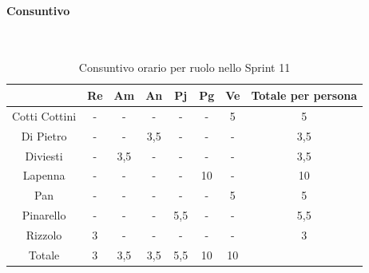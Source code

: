 \documentclass{article}
\begin{document}
                \paragraph{Consuntivo}\mbox{}\\
                \begin{table}[H]
                    \centering
                    \begin{tabular}{|c|c|c|c|c|c|c|c|}
                    \hline
                                  & Re  & Am  & An  & Pj  & Pg  & Ve  & Totale per persona \\ \hline
                    Cotti Cottini & -   & -   & -   & -   & -   & 5   & 5                  \\ \hline
                    Di Pietro     & -   & -   & 3,5 & -   & -   & -   & 3,5                \\ \hline
                    Diviesti      & -   & 3,5 & -   & -   & -   & -   & 3,5                \\ \hline
                    Lapenna       & -   & -   & -   & -   & 10  & -   & 10                 \\ \hline
                    Pan           & -   & -   & -   & -   & -   & 5   & 5                  \\ \hline
                    Pinarello     & -   & -   & -   & 5,5 & -   & -   & 5,5                \\ \hline
                    Rizzolo       & 3   & -   & -   & -   & -   & -   & 3                  \\ \hline
                    Totale        & 3   & 3,5 & 3,5 & 5,5 & 10  & 10  &                    \\ \hline
                    \end{tabular}
                    \caption{Consuntivo orario per ruolo nello Sprint 11}
                \end{table}

\end{document}
